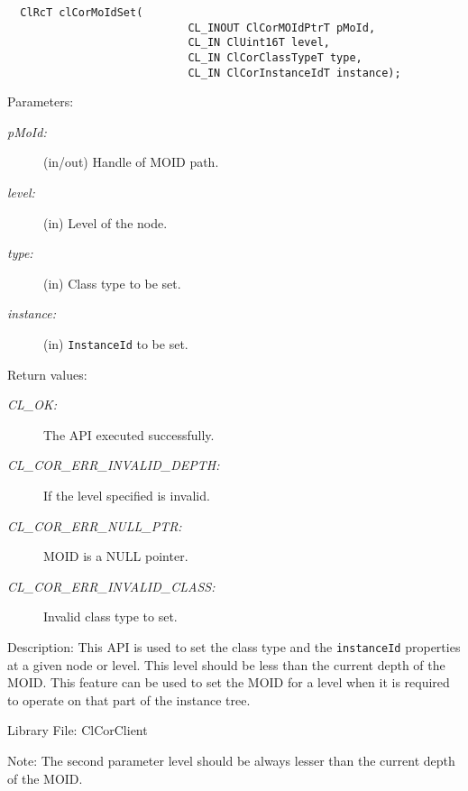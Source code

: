 \begin{flushleft}
\begin{Desc}
\footnotesize\begin{verbatim}  ClRcT clCorMoIdSet(
             				CL_INOUT ClCorMOIdPtrT pMoId,
             				CL_IN ClUint16T level,
             				CL_IN ClCorClassTypeT type,
             				CL_IN ClCorInstanceIdT instance);
\end{verbatim}
\normalsize
\end{Desc}
\begin{Desc}
\item[Parameters:]
\begin{description}
\item[{\em p\-MoId:}](in/out) Handle of MOID path. 
\item[{\em level:}](in) Level of the node. 
\item[{\em type:}](in) Class type to be set. 
\item[{\em instance:}](in) {\tt{InstanceId}} to be set.\end{description}
\end{Desc}
\begin{Desc}
\item[Return values:]
\begin{description}
\item[{\em CL\_\-OK:}]The API executed successfully. 
\item[{\em CL\_\-COR\_\-ERR\_\-INVALID\_\-DEPTH:}]If the level specified is invalid. 
\item[{\em CL\_\-COR\_\-ERR\_\-NULL\_\-PTR:}]MOID is a NULL pointer.
\item[{\em CL\_\-COR\_\-ERR\_\-INVALID\_\-CLASS:}]Invalid class type to set.\end{description}
\end{Desc}
\begin{Desc}
\item[Description:]This API is used to set the class type and the {\tt{instanceId}} properties at a given node or level. This level should be 
less than the current depth of the MOID. This feature can be used to set the MOID for a level when it is required to operate on that part 
of the instance tree.\end{Desc}
\begin{Desc}
\item[Library File:]Cl\-Cor\-Client\end{Desc}
\begin{Desc}
\item[Note:]The second parameter level should be always lesser than the current depth of the MOID.\end{Desc}

\end{flushleft}
